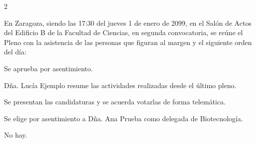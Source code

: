 \documentclass[11pt,a4paper]{article}
\begin{document}
\begin{paracol}{2}
\begin{asistencia}



\end{asistencia}

\switchcolumn
En Zaragoza, siendo las 17:30 del jueves 1 de enero de 2099, en el Salón de
Actos del Edificio B de la Facultad de Ciencias, en segunda convocatoria, se
reúne el Pleno \delorgano{} con la asistencia de las personas que figuran al
margen y el siguiente orden del día:

Se aprueba por asentimiento.

Dña. Lucía Ejemplo resume las actividades realizadas desde el último pleno.

\end{paracol}

Se presentan las candidaturas y se acuerda votarlas de forma telemática.

Se elige por asentimiento a Dña. Ana Prueba como delegada de Biotecnología.

No hay.

\firma
\end{document}

